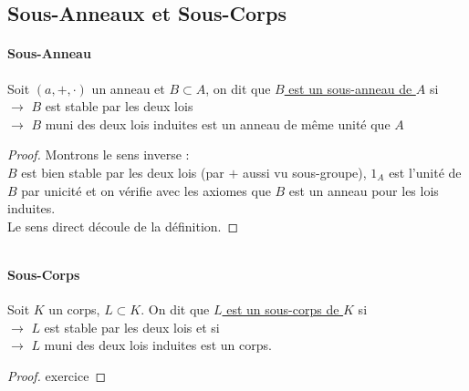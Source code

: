 	\subsection{Sous-Anneaux et Sous-Corps}
		\traitd
		\paragraph{Sous-Anneau}
			Soit $(a,+,\cdot)$ un anneau et $B\subset A$, on dit que \uline{$B$ est un sous-anneau de $A$} si\\
			\hspace*{2cm} $\rightarrow$ $B$ est stable par les deux lois\\
			\hspace*{2cm} $\rightarrow$ $B$ muni des deux lois induites est un anneau de même unité que $A$ \trait
		\begin{proof}
		Montrons le sens inverse : \\
		$B$ est bien stable par les deux lois (par $+$ aussi vu sous-groupe), $1_A$ est l'unité de $B$ par unicité et on vérifie avec les axiomes que $B$ est un anneau pour les lois induites. \\Le sens direct découle de la définition.
		\end{proof} ${}$ \traitd
		\paragraph{Sous-Corps}
			Soit $K$ un corps, $L\subset K$. On dit que \uline{$L$ est un sous-corps de $K$} si \\
			\hspace*{2cm} $\rightarrow$ $L$ est stable par les deux lois et si \\
			\hspace*{2cm} $\rightarrow$ $L$ muni des deux lois induites est un corps. \trait
		\vspace*{0.5cm} \\ 
		\begin{proof}
		exercice
		\end{proof}
